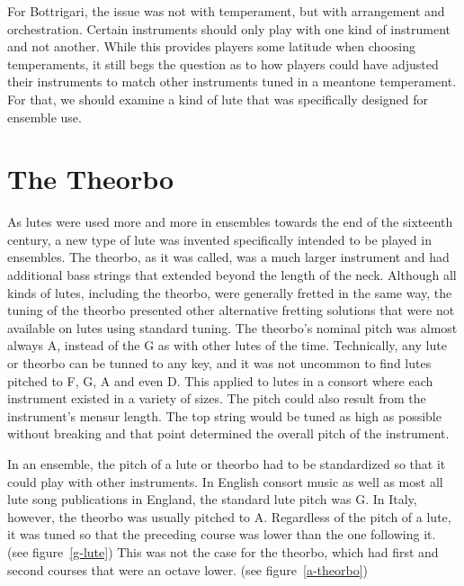 For Bottrigari, the issue was not with temperament, but with arrangement and
orchestration.  Certain instruments should only play with one kind of instrument
and not another.  While this provides players some latitude when choosing temperaments,
it still begs the question as to how players could have adjusted their instruments
to match other instruments tuned in a meantone temperament.  For that, we should
examine a kind of lute that was specifically designed for ensemble use.

\section{The Theorbo}

As lutes were used more and more in ensembles towards the end of the sixteenth century, a new type
of lute was invented specifically intended to be played in ensembles.  The theorbo, as it was
called, was a much larger instrument and had additional bass strings that extended beyond the length
of the neck.  Although all kinds of lutes, including the theorbo, were generally fretted in the same
way, the tuning of the theorbo presented other alternative fretting solutions that were not
available on lutes using standard tuning.  The theorbo's nominal pitch was almost always A, instead
of the G as with other lutes of the time.  Technically, any lute or theorbo can be tunned to any
key, and it was not uncommon to find lutes pitched to F, G, A and even D.  This applied to lutes in
a consort where each instrument existed in a variety of sizes.  The pitch could also result from the
instrument's mensur length.  The top string would be tuned as high as possible without breaking and
that point determined the overall pitch of the instrument.

In an ensemble, the pitch of a lute or theorbo had to be
standardized so that it could play with other instruments.  In English consort music as
well as most all lute song publications in England, the standard lute pitch was G.
In Italy, however, the theorbo was usually pitched to A.  Regardless of the pitch of a
lute, it was tuned so that the preceding course was lower than the one
following it. (see figure~\ref{g-lute})  This was not the case for the theorbo, which
had first and second courses that were an octave lower. (see figure~\ref{a-theorbo})

